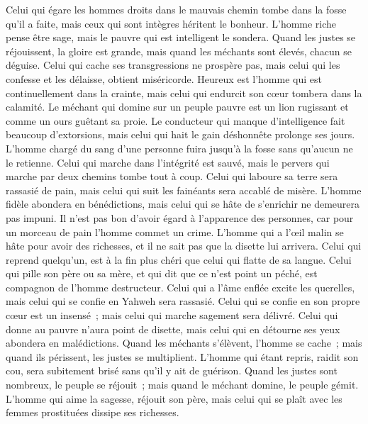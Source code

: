 \begin{multicols}{2}
Celui qui égare les hommes droits dans le mauvais chemin tombe dans la fosse qu'il a faite, mais ceux qui sont intègres héritent le bonheur.
L'homme riche pense être sage, mais le pauvre qui est intelligent le sondera.
Quand les justes se réjouissent, la gloire est grande, mais quand les méchants sont élevés, chacun se déguise.
Celui qui cache ses transgressions ne prospère pas, mais celui qui les confesse et les délaisse, obtient miséricorde.
Heureux est l'homme qui est continuellement dans la crainte, mais celui qui endurcit son cœur tombera dans la calamité.
Le méchant qui domine sur un peuple pauvre est un lion rugissant et comme un ours guêtant sa proie.
Le conducteur qui manque d'intelligence fait beaucoup d'extorsions, mais celui qui hait le gain déshonnête prolonge ses jours.
L'homme chargé du sang d'une personne fuira jusqu'à la fosse sans qu'aucun ne le retienne.
Celui qui marche dans l'intégrité est sauvé, mais le pervers qui marche par deux chemins tombe tout à coup.
Celui qui laboure sa terre sera rassasié de pain, mais celui qui suit les fainéants sera accablé de misère.
L'homme fidèle abondera en bénédictions, mais celui qui se hâte de s'enrichir ne demeurera pas impuni.
Il n'est pas bon d'avoir égard à l'apparence des personnes, car pour un morceau de pain l'homme commet un crime.
L'homme qui a l'œil malin se hâte pour avoir des richesses, et il ne sait pas que la disette lui arrivera.
Celui qui reprend quelqu'un, est à la fin plus chéri que celui qui flatte de sa langue.
Celui qui pille son père ou sa mère, et qui dit que ce n'est point un péché, est compagnon de l'homme destructeur.
Celui qui a l'âme enflée excite les querelles, mais celui qui se confie en Yahweh sera rassasié.
Celui qui se confie en son propre cœur est un insensé~; mais celui qui marche sagement sera délivré.
Celui qui donne au pauvre n'aura point de disette, mais celui qui en détourne ses yeux abondera en malédictions.
Quand les méchants s'élèvent, l'homme se cache~; mais quand ils périssent, les justes se multiplient.
\VerseOne{}L'homme qui étant repris, raidit son cou, sera subitement brisé sans qu'il y ait de guérison.
Quand les justes sont nombreux, le peuple se réjouit~; mais quand le méchant domine, le peuple gémit.
L'homme qui aime la sagesse, réjouit son père, mais celui qui se plaît avec les femmes prostituées dissipe ses richesses.

\end{multicols}
